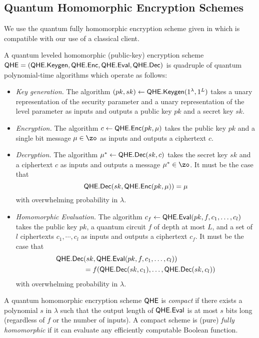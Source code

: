 \subsection{Quantum Homomorphic Encryption Schemes}

We use the quantum fully homomorphic encryption scheme given in \cite{mahadev_qfhe} which is compatible with our use of a classical client.
\begin{definition}
    A quantum leveled homomorphic (public-key) encryption scheme $\mathsf{QHE}=(\mathsf{QHE.Keygen}, \mathsf{QHE.Enc}, \mathsf{QHE.Eval}, \mathsf{QHE.Dec})$ is quadruple of quantum polynomial-time algorithms which operate as follows:
    \begin{itemize}
        \item \emph{Key generation.}
            The algorithm $(pk, sk)\leftarrow\mathsf{QHE.Keygen}(1^\lambda, 1^L)$ takes a unary representation of the security parameter and a unary representation of the level parameter as inputs and outputs a public key $pk$ and a secret key $sk$.
        \item \emph{Encryption.}
            The algorithm $c\leftarrow\mathsf{QHE.Enc}(pk, \mu)$ takes the public key $pk$ and a single bit message $\mu\in\zo$ as inputs and outputs a ciphertext $c$.
        \item \emph{Decryption.}
            The algorithm $\mu^*\leftarrow\mathsf{QHE.Dec}(sk, c)$ takes the secret key $sk$ and a ciphertext $c$ as inputs and outputs a message $\mu^*\in\zo$.
            It must be the case that
                $$\mathsf{QHE.Dec}(sk, \mathsf{QHE.Enc}(pk, \mu))=\mu$$
            with overwhelming probability in $\lambda$.
        \item \emph{Homomorphic Evaluation.}
            The algorithm $c_f\leftarrow\mathsf{QHE.Eval}(pk, f, c_1, \ldots, c_l)$ takes the public key $pk$, a quantum circuit $f$ of depth at most $L$, and a set of $l$ ciphertexts $c_1,\cdots,c_l$ as inputs and outputs a ciphertext $c_f$.
            It must be the case that
            \begin{align*}
                \mathsf{QHE.Dec}&(sk, \mathsf{QHE.Eval}(pk, f, c_1, \ldots, c_l))
                \\
                &=f(\mathsf{QHE.Dec}(sk, c_1),\ldots,\mathsf{QHE.Dec}(sk, c_l))
            \end{align*}
            with overwhelming probability in $\lambda$.
    \end{itemize}
\end{definition}

\begin{definition}
    A quantum homomorphic encryption scheme $\mathsf{QHE}$ is \emph{compact} if
    there exists a polynomial $s$ in $\lambda$ such that the output length of $\mathsf{QHE.Eval}$ is at most $s$ bits long (regardless of $f$ or
    the number of inputs). A compact scheme is (pure) \emph{fully homomorphic} if it can evaluate any efficiently computable
    Boolean function.
\end{definition}


